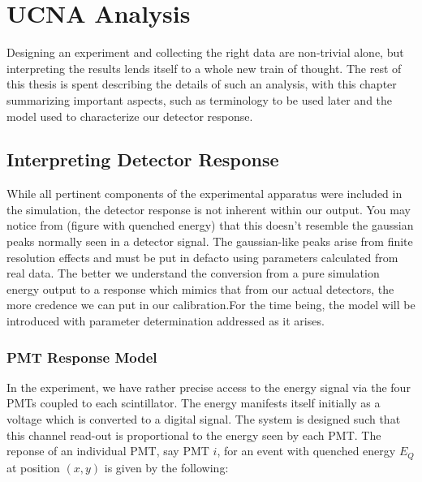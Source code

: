 \chapter{UCNA Analysis}
\label{ch:UCNA_Analysis}

Designing an experiment and collecting the right data are non-trivial alone,
but interpreting the results lends itself to a whole new train of thought.
The rest of this thesis is spent describing the details of such an
analysis, with this chapter summarizing important aspects,
such as terminology to be used later and the
model used to characterize our detector response.



\section{Interpreting Detector Response}
While all pertinent components of the experimental apparatus were included
in the simulation, the detector response is not inherent within our
output. You may notice from (figure with quenched energy) that this
doesn't resemble the gaussian peaks normally seen in a detector signal.
The gaussian-like peaks arise from finite resolution effects and
must be put in defacto using parameters calculated
from real data. The better we understand the conversion from a pure simulation
energy output to a response which mimics that from our actual detectors, the
more credence we can put in our calibration.For the time being, the model will be introduced with parameter determination addressed as it arises. 

\subsection{PMT Response Model} \label{sssec:pmtModel}
In the experiment, we have rather precise access to the energy signal via the four PMTs coupled to each scintillator. The energy manifests itself initially as a voltage
which is converted to a digital signal. The system is designed such that this channel
read-out is proportional to the energy seen by each PMT. The reponse of an individual
PMT, say PMT $i$, for an event with quenched energy $E_Q$ at position $(x,y)$ 
is given by the following: 

